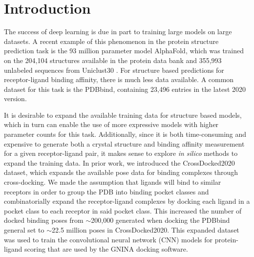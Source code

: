 \documentclass[journal=jcim,manuscript=article]{achemso}
\begin{document}

\section{Introduction}

The success of deep learning is due in part to training large models on large datasets.
A recent example of this phenomenon in the protein structure prediction task is the 93 million parameter model AlphaFold, which was trained on the 204,104 structures available in the protein data bank and 355,993 unlabeled sequences from Uniclust30 \cite{alphafold}.
For structure based predictions for receptor-ligand binding affinity, there is much less data available.
A common dataset for this task is the PDBbind,\cite{pdbbind2016} containing 23,496 entries in the latest 2020 version.

It is desirable to expand the available training data for structure based models, which in turn can enable the use of more expressive models with higher parameter counts for this task.
Additionally, since it is both time-consuming and expensive to generate both a crystal structure and binding affinity measurement for a given receptor-ligand pair, it makes sense to explore \textit{in silico} methods to expand the training data.
In prior work, we introduced the CrossDocked2020 dataset, which expands the available pose data for binding complexes through cross-docking\cite{crossdocked2020}.
We made the assumption that ligands will bind to similar receptors in order to group the PDB into binding pocket classes and combinatorially expand the receptor-ligand complexes by docking each ligand in a pocket class to each receptor in said pocket class.
This increased the number of docked binding poses from $\sim$200,000 generated when docking the PDBbind general set to $\sim$22.5 million poses in CrossDocked2020\cite{crossdocked2020}. This expanded dataset was used to train the convolutional neural network (CNN) models for protein-ligand scoring\cite{ragoza2017protein} that are used by the GNINA docking software.\cite{mcnutt2021gnina}
\end{document}
